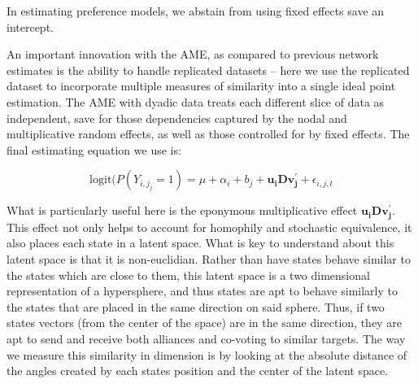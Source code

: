 In estimating preference models, we abstain from using fixed effects save an intercept.

An important innovation with the AME, as compared to previous network estimates is the ability to handle replicated datasets -- here we use the replicated dataset to incorporate multiple measures of similarity into a single ideal point estimation.  The AME with dyadic data treats each different slice of data as independent, save for those dependencies captured by the nodal and multiplicative random effects, as well as those controlled for by fixed effects. The final estimating equation we use is:

\begin{equation}
	\text{logit}(P(Y_{i,j_j} = 1) = \mu + \alpha_{i} + b_{j} + \mathbf{u_{i}Dv^{'}_{j}} + \epsilon_{i,j,t}
\end{equation}

What is particularly useful here is the eponymous multiplicative effect $\mathbf{u_{i}Dv^{'}_{j}}$. This effect not only helps to account for homophily and stochastic equivalence, it also places each state in a latent space. What is key to understand about this latent space is that it is non-euclidian. Rather than have states behave similar to the states which are close to them, this latent space is a two dimensional representation of a hypersphere, and thus states are apt to behave similarly to the states that are placed in the same direction on said sphere. Thus, if two states vectors (from the center of the space) are in the same direction, they are apt to send and receive both alliances and co-voting to similar targets. The way we measure this similarity in dimension is by looking at the absolute distance of the angles created by each states position and the center of the latent space. 



